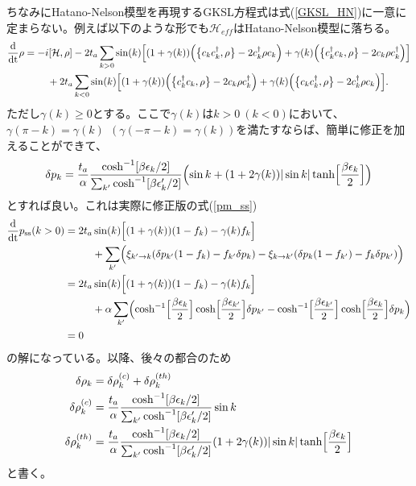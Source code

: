 \documentclass[dvipdfmx,autodetect-engine]{jsarticle}
\newcommand{\da}{\dagger}
\newcommand{\m}[1]{\mathcal{#1}}
\newcommand{\mr}[1]{\mathrm{#1}}
\newcommand{\dt}{\frac{\mr{d}}{\mr{dt}}}
\newcommand{\bv}[1]{\Bigl(#1\Bigr)}
\newcommand{\bg}[1]{\Bigl[#1\Bigr]}
\begin{document}
ちなみにHatano-Nelson模型を再現するGKSL方程式は式(\ref{GKSL_HN})に一意に定まらない。例えば以下のような形でも$\m{H}_{eff}$はHatano-Nelson模型に落ちる。
\begin{align}
    \dt \rho &= -i[\m{H}, \rho] - 2t_a\sum_{k>0}\sin(k)  \bg{(1+\gamma(k))\Bigl(\bigl\{c_k c_k^\da, \rho\bigr\}-2c_k^\da\rho c_k\Bigr) + \gamma(k)\Bigl(\bigl\{c_k^\da c_k, \rho\bigr\}-2c_k\rho c_k^\da\Bigr)}\nonumber\\
    & \ \ \ \ \ \ \ + 2t_a\sum_{k<0} \sin(k)  \bg{(1+\gamma(k))\Bigl(\bigl\{c_k^\da c_k, \rho\bigr\}-2c_k\rho c_k^\da\Bigr) + \gamma(k)\Bigl(\bigl\{c_k c_k^\da, \rho\bigr\}-2c_k^\da\rho c_k\Bigr)}.
\end{align}
ただし$\gamma(k)\geq0$とする。ここで$\gamma(k)$は$k>0 \ (k<0)$において、$\gamma(\pi - k) = \gamma(k) \ \ (\gamma(-\pi - k) = \gamma(k))$を満たすならば、簡単に修正を加えることができて、
\begin{align}
    \delta p_k = \frac{t_a}{\alpha}\frac{\cosh^{-1}[\beta\epsilon_k/2]}{\sum_{k'}\cosh^{-1}[\beta\epsilon_k'/2]} \bv{\sin k + (1+2\gamma(k))|\sin k|\tanh\bg{\frac{\beta\epsilon_k}{2}}}
\end{align}
とすれば良い。これは実際に修正版の式(\ref{pm_ss})
\begin{align}
    \dt p_{\mr{ss}}(k>0) &= 2t_a \sin(k) \bg{(1+\gamma(k))(1-f_k) - \gamma(k)f_k}\nonumber\\
    & \ \ \ \ \ \ \ \ +\sum_{k'}\bv{\xi_{k'\rightarrow k} (\delta p_{k'}(1-f_k) - f_{k'}\delta p_k )- \xi_{k\rightarrow k'} (\delta p_{k}(1-f_{k'}) - f_k\delta p_{k'})}\nonumber\\
  &= 2t_a \sin(k) \bg{(1+\gamma(k))(1-f_k) - \gamma(k)f_k} \nonumber\\
    & \ \ \ \ \ \ \ \ +\alpha\sum_{k'}\bv{\cosh^{-1}\bg{\frac{\beta\epsilon_k}{2}}\cosh\bg{\frac{\beta\epsilon_{k'}}{2}}\delta p_{k'} - \cosh^{-1}\bg{\frac{\beta\epsilon_{k'}}{2}}\cosh\bg{\frac{\beta\epsilon_{k}}{2}}\delta p_{k}}\nonumber\\
  &= 0
\end{align}
の解になっている。以降、後々の都合のため
\begin{align}
    \delta\rho_k &= \delta\rho^{(c)}_k + \delta\rho^{(th)}_k\\
    \delta\rho^{(c)}_k &= \frac{t_a}{\alpha}\frac{\cosh^{-1}[\beta\epsilon_k/2]}{\sum_{k'}\cosh^{-1}[\beta\epsilon_k'/2]} \sin k\\
    \delta\rho^{(th)}_k &= \frac{t_a}{\alpha}\frac{\cosh^{-1}[\beta\epsilon_k/2]}{\sum_{k'}\cosh^{-1}[\beta\epsilon_k'/2]} (1+2\gamma(k))|\sin k|\tanh\bg{\frac{\beta\epsilon_k}{2}}
\end{align}
と書く。
\end{document}
